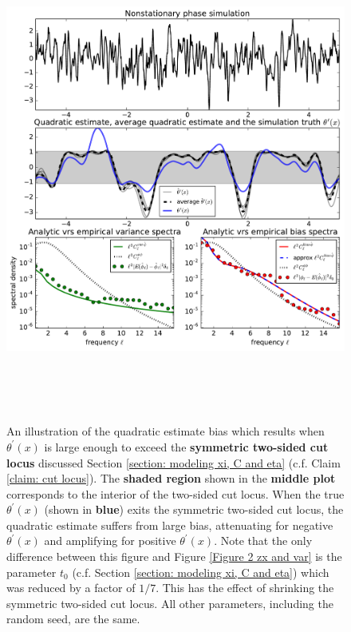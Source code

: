 \documentclass[10pt,noinfoline]{imsart}
\begin{document}
\begin{figure}
\includegraphics[height=16cm]{figure3.pdf}%
\caption{ An illustration of the quadratic estimate bias which results when $\theta^\prime(x)$ is large enough to exceed the \textbf{symmetric two-sided cut locus} discussed Section \ref{section: modeling xi, C and eta} (c.f. Claim \ref{claim: cut locus}). The \textbf{shaded region} shown in the \textbf{middle plot} corresponds to the interior of the two-sided cut locus. When the true  $\theta^\prime(x)$ (shown in \textbf{blue}) exits the symmetric two-sided cut locus, the quadratic estimate suffers from large bias, attenuating for negative $\theta^\prime(x)$ and amplifying for positive $\theta^\prime(x)$. Note that the only difference between this figure and Figure \ref{Figure 2 zx and var} is the parameter $t_0$ (c.f. Section \ref{section: modeling xi, C and eta}) which was reduced by a factor of $1/7$. This has the effect of shrinking the symmetric two-sided cut locus. All other parameters, including the random seed, are the same.}
\label{Figure 2 zx and var, extra bias}
\end{figure}
\end{document}
